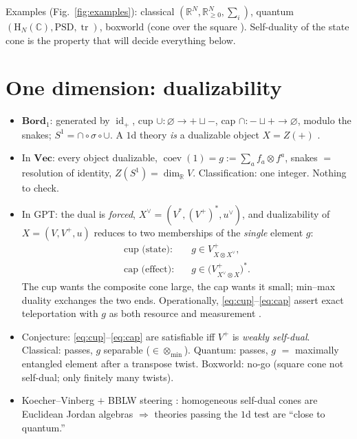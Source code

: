 \documentclass[prl,aps,10pt,superscriptaddress,floatfix]{revtex4-2}
\begin{document}
Examples (Fig.~\ref{fig:examples}): classical $(\mathbb{R}^N,\mathbb{R}^N_{\ge0},\textstyle\sum_i)$, quantum $(\mathrm{H}_N(\mathbb{C}),\mathrm{PSD},\operatorname{tr})$, boxworld (cone over the square \cite{Barrett2007}). Self-duality of the state cone is the property that will decide everything below.

\section{One dimension: dualizability}\label{sec:1d}

\begin{itemize}
\item $\mathbf{Bord}_1$: generated by $\operatorname{id}_+$, cup $\cup:\varnothing\to+\sqcup-$, cap $\cap:-\sqcup+\to\varnothing$, modulo the snakes; $S^1=\cap\circ\sigma\circ\cup$. A $1$d theory \emph{is} a dualizable object $X=Z(+)$ \cite{Lurie2009}.
\item In $\mathbf{Vec}$: every object dualizable, $\operatorname{coev}(1)=g:=\sum_af_a\otimes f^a$, snakes $=$ resolution of identity, $Z(S^1)=\dim_{\mathbb R}V$. Classification: one integer. Nothing to check.
\item In GPT: the dual is \emph{forced}, $X^\vee=(V^*,(V^+)^*,u^\vee)$, and dualizability of $X=(V,V^+,u)$ reduces to two memberships of the \emph{single} element $g$:
\begin{align}
\text{cup (state):}&\quad g\in V^+_{X\otimes X^\vee},\label{eq:cup}\\
\text{cap (effect):}&\quad g\in\big(V^+_{X^\vee\otimes X}\big)^{*}.\label{eq:cap}
\end{align}
The cup wants the composite cone large, the cap wants it small; min--max duality exchanges the two ends. Operationally, \eqref{eq:cup}--\eqref{eq:cap} assert exact teleportation with $g$ as both resource and measurement \cite{BBLW}.
\item Conjecture: \eqref{eq:cup}--\eqref{eq:cap} are satisfiable iff $V^+$ is \emph{weakly self-dual}. Classical: passes, $g$ separable ($\in\otimes_{\min}$). Quantum: passes, $g$ $=$ maximally entangled element after a transpose twist. Boxworld: no-go (square cone not self-dual; only finitely many twists).
\item Koecher--Vinberg \cite{KoecherVinberg} $+$ BBLW steering \cite{BBLW}: homogeneous self-dual cones are Euclidean Jordan algebras $\Rightarrow$ theories passing the $1$d test are ``close to quantum.''
\end{itemize}
\end{document}
